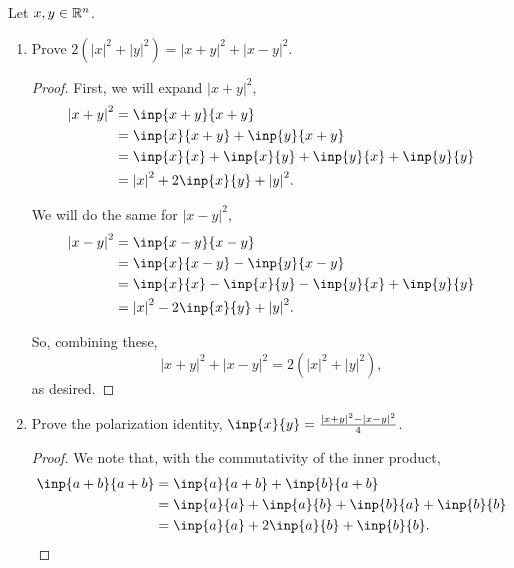 \documentclass[..hw1]{subfiles}
\begin{document}
\begin{problem}
Let $x,y\in \mathbb{R}^{n}$. \begin{enumerate}[label=\alph*)]
	\item Prove $2\left( {|x|}^2+{|y|}^2 \right) = {|x+y|}^2+{|x-y|}^2$.
	      \begin{proof}[Proof]
		      First, we will expand ${|x+y|}^2$,
		      \begin{align*}
			      {|x+y|}^2 & = \inp{x+y}{x+y}                              \\
			                & = \inp{x}{x+y}+\inp{y}{x+y}                   \\
			                & = \inp{x}{x}+\inp{x}{y}+\inp{y}{x}+\inp{y}{y} \\
			                & = {|x|}^2+2\inp{x }{y }+{|y|}^2.              \\
		      \end{align*}

		      We will do the same for ${|x-y|}^2$,
		      \begin{align*}
			      {|x-y|}^2 & = \inp{x-y}{x-y}                                      \\
			                & = \inp{x }{x-y }-\inp{y }{x-y }                       \\
			                & = \inp{x }{x }-\inp{x }{y }-\inp{y }{x }+\inp{y }{y } \\
			                & = {|x|}^2-2\inp{x }{y }+{|y|}^2.                      \\
		      \end{align*}

		      So, combining these, \[
			      {|x+y|}^2+{|x-y|}^2=2\left( {|x|}^2+{|y|}^2 \right)
			      ,\] as desired.
	      \end{proof}
	\item Prove the polarization identity, $\inp{x}{y}=\frac{{|x+y|}^2-{|x-y|}^2}{4}$.
	      \begin{proof}
		      We note that, with the commutativity of the inner product,
		      \begin{align*}
			      \inp{a+b}{a+b} & = \inp{a}{a+b}+\inp{b}{a+b}                     \\
			                     & = \inp{a}{a} + \inp{a}{b}+\inp{b}{a}+\inp{b}{b} \\
			                     & = \inp{a}{a}+2\inp{a}{b}+\inp{b}{b}.            \\
		      \end{align*}


\end{proof}
\end{enumerate}
\end{problem}
\end{document}
